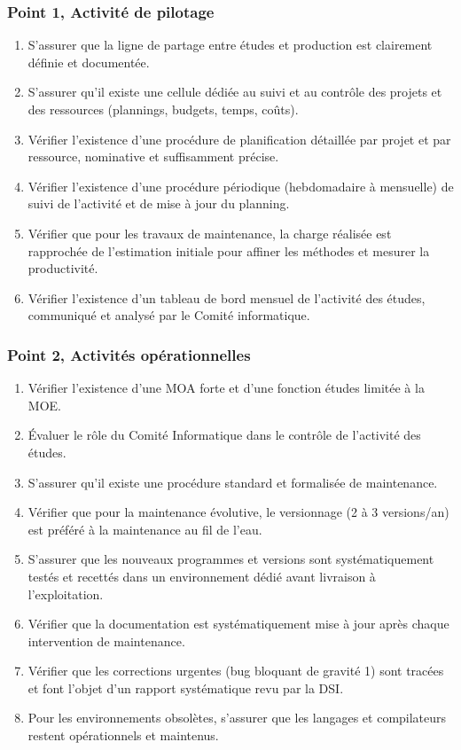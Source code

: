 \subsubsection{Point 1, Activité de pilotage}
\begin{enumerate}[label=1.\arabic*.]
    \item S'assurer que la ligne de partage entre études et production est clairement définie et documentée.
    \item S'assurer qu'il existe une cellule dédiée au suivi et au contrôle des projets et des ressources (plannings, budgets, temps, coûts).
    \item Vérifier l'existence d'une procédure de planification détaillée par projet et par ressource, nominative et suffisamment précise.
    \item Vérifier l'existence d'une procédure périodique (hebdomadaire à mensuelle) de suivi de l'activité et de mise à jour du planning.
    \item Vérifier que pour les travaux de maintenance, la charge réalisée est rapprochée de l'estimation initiale pour affiner les méthodes et mesurer la productivité.
    \item Vérifier l'existence d'un tableau de bord mensuel de l'activité des études, communiqué et analysé par le Comité informatique.
\end{enumerate}

\subsubsection{Point 2, Activités opérationnelles}
\begin{enumerate}[label=2.\arabic*.]
    \item Vérifier l'existence d'une MOA forte et d'une fonction études limitée à la MOE.
    \item Évaluer le rôle du Comité Informatique dans le contrôle de l'activité des études.
    \item S'assurer qu'il existe une procédure standard et formalisée de maintenance.
    \item Vérifier que pour la maintenance évolutive, le versionnage (2 à 3 versions/an) est préféré à la maintenance au fil de l'eau.
    \item S'assurer que les nouveaux programmes et versions sont systématiquement testés et recettés dans un environnement dédié avant livraison à l'exploitation.
    \item Vérifier que la documentation est systématiquement mise à jour après chaque intervention de maintenance.
    \item Vérifier que les corrections urgentes (bug bloquant de gravité 1) sont tracées et font l'objet d'un rapport systématique revu par la DSI.
    \item Pour les environnements obsolètes, s'assurer que les langages et compilateurs restent opérationnels et maintenus.
\end{enumerate}

